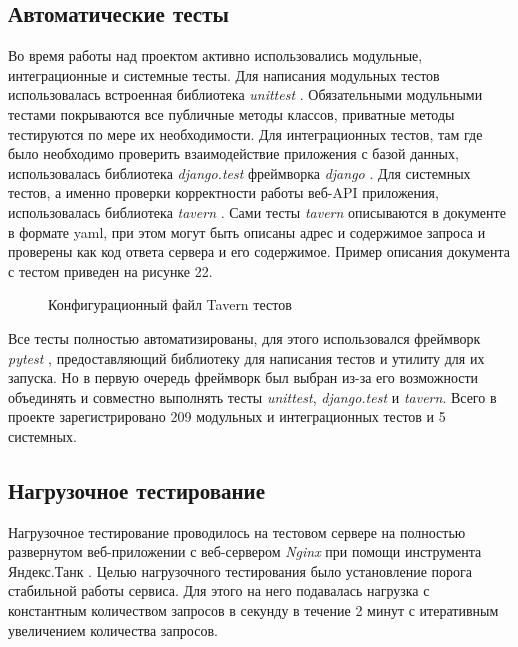     \subsection{Автоматические тесты}
    Во время работы над проектом активно использовались модульные,
    интеграционные и системные тесты. \cite{test.kulikov}
    Для написания модульных тестов использовалась
    встроенная библиотека \textit{unittest} \cite{test.unittest}.
    Обязательными модульными тестами покрываются все публичные методы классов,
    приватные методы тестируются по мере их необходимости.
    Для интеграционных тестов,
    там где было необходимо проверить взаимодействие приложения с базой данных,
    использовалась библиотека \textit{django.test} фреймворка \textit{django}
    \cite{docs.django}.
    Для системных тестов, а именно проверки корректности работы веб-API
    приложения, использовалась библиотека \textit{tavern} \cite{test.tavern}.
    Сами тесты \textit{tavern} описываются в документе в формате yaml, при этом
    могут быть описаны адрес и содержимое запроса и
    проверены как код ответа сервера и его содержимое.
    Пример описания документа с тестом приведен на рисунке 22.
    \begin{figure}[H]
        \centering
        
        \caption{Конфигурационный файл Tavern тестов}
        \label{fig:tavern-tests}
    \end{figure}

    Все тесты полностью автоматизированы, для этого использовался
    фреймворк \textit{pytest} \cite{test.pytest},
    предоставляющий библиотеку для написания тестов и
    утилиту для их запуска. Но в первую очередь фреймворк был выбран из-за его
    возможности объединять и совместно выполнять тесты
    \textit{unittest}, \textit{django.test} и \textit{tavern}.
    Всего в проекте зарегистрировано 209 модульных и интеграционных тестов и
    5 системных.

    \subsection{Нагрузочное тестирование}
    Нагрузочное тестирование проводилось на тестовом сервере на полностью
    развернутом веб-приложении с веб-сервером \textit{Nginx} при помощи
    инструмента Яндекс.Танк \cite{test.yandex.tank}.
    Целью нагрузочного тестирования было установление
    порога стабильной работы сервиса. Для этого на него подавалась нагрузка
    с константным количеством запросов в секунду в течение 2 минут с итеративным
    увеличением количества запросов.

